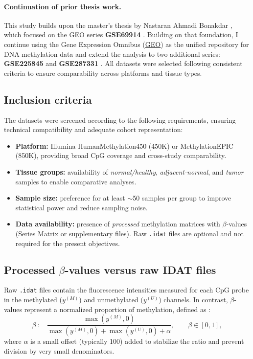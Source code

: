 \documentclass[10pt]{extarticle}
\begin{document}
\paragraph{Continuation of prior thesis work.}
This study builds upon the master’s thesis by Nastaran Ahmadi Bonakdar \cite{Bonakdar2025}, which focused on the GEO series \textbf{GSE69914} \cite{GSE69914}.  
Building on that foundation, I continue using the Gene Expression Omnibus (\href{https://www.ncbi.nlm.nih.gov/geo/}{GEO}) as the unified repository for DNA methylation data and extend the analysis to two additional series: \textbf{GSE225845} \cite{GSE225845} and \textbf{GSE287331} \cite{GSE287331}.  
All datasets were selected following consistent criteria to ensure comparability across platforms and tissue types.

\subsection{Inclusion criteria}
The datasets were screened according to the following requirements, ensuring technical compatibility and adequate cohort representation:

\begin{itemize}[label=-]
  \item \textbf{Platform:} Illumina HumanMethylation450 (450K) or MethylationEPIC (850K), providing broad CpG coverage and cross-study comparability.
  \item \textbf{Tissue groups:} availability of \emph{normal/healthy}, \emph{adjacent-normal}, and \emph{tumor} samples to enable comparative analyses.
  \item \textbf{Sample size:} preference for at least $\sim$50 samples per group to improve statistical power and reduce sampling noise.
  \item \textbf{Data availability:} presence of \emph{processed} methylation matrices with $\beta$-values (Series Matrix or supplementary files). Raw \texttt{.idat} files are optional and not required for the present objectives.
\end{itemize}


\subsection{Processed $\beta$-values versus raw IDAT files}

Raw \texttt{.idat} files contain the fluorescence intensities measured for each CpG probe in the methylated ($y^{(M)}$) and unmethylated ($y^{(U)}$) channels.  
In contrast, $\beta$-values represent a normalized proportion of methylation, defined as \cite{Du2010}:
\[
\beta := \frac{\max(y^{(M)},0)}{\max(y^{(M)},0)+\max(y^{(U)},0)+\alpha}, \qquad \beta\in[0,1],
\]
where $\alpha$ is a small offset (typically 100) added to stabilize the ratio and prevent division by very small denominators.
\end{document}
